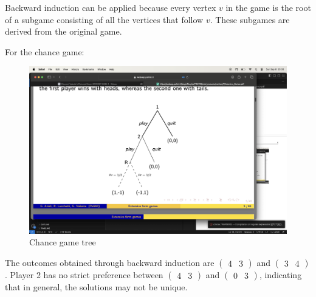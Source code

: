 Backward induction can be applied because every vertex $v$ in the game is the root of a subgame consisting of all the vertices that follow $v$. 
These subgames are derived from the original game.
\begin{example}
    For the chance game: 
    \begin{figure}[H]
        \centering
        \includegraphics[width=0.75\linewidth]{images/tree1.png}
        \caption{Chance game tree}
    \end{figure}
    The outcomes obtained through backward induction are $\begin{pmatrix} 4 & 3 \end{pmatrix}$ and $\begin{pmatrix} 3 & 4 \end{pmatrix}$. 
    Player 2 has no strict preference between $\begin{pmatrix} 4 & 3 \end{pmatrix}$ and $\begin{pmatrix} 0 & 3 \end{pmatrix}$, indicating that in general, the solutions may not be unique.
\end{example}